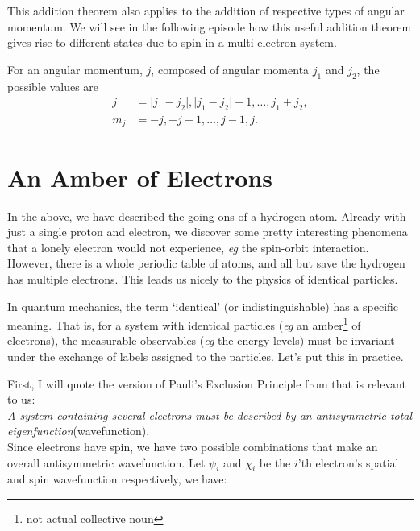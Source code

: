 \documentclass{article}
\numberwithin{equation}{section} %
\begin{document}
This addition theorem also applies to the addition of respective types of angular momentum. We will see in the following episode how this useful addition theorem gives rise to different states due to spin in a multi-electron system.


\begin{tcolorbox}[colback=pink]
For an angular momentum, $j$, composed of angular momenta $j_1$ and $j_2$, the possible values are 
\begin{equation}
\begin{split} 
j&=\vert j_1-j_2\vert, \vert j_1-j_2\vert+1,\dots,j_1+j_2,\\
m_j&=-j,-j+1,\dots,j-1,j.
\end{split}
\end{equation}
\end{tcolorbox}
\section{An Amber of Electrons}
In the above, we have described the going-ons of a hydrogen atom. Already with just a single proton and electron, we discover some pretty interesting phenomena that a lonely electron would not experience, \textit{eg} the spin-orbit interaction. However, there is a whole periodic table of atoms, and all but save the hydrogen has multiple electrons. This leads us nicely to the physics of identical particles.

In quantum mechanics, the term `identical' (or indistinguishable) has a specific meaning. That is, for a system with identical particles (\textit{eg} an amber\footnote{not actual collective noun} of electrons), the measurable observables (\textit{eg} the energy levels) must be invariant under the exchange of labels assigned to the particles. Let's put this in practice. 

First, I will quote the version of Pauli's Exclusion Principle from \cite{eisberg} that is relevant to us:\\

\noindent \textit{A system containing several electrons must be described by an antisymmetric total eigenfunction}(wavefunction).\\

Since electrons have spin, we have two possible combinations that make an overall antisymmetric wavefunction. Let $\psi_i$ and $\chi_i$ be the $i$'th electron's spatial and spin wavefunction respectively, we have: \\
\end{document}
